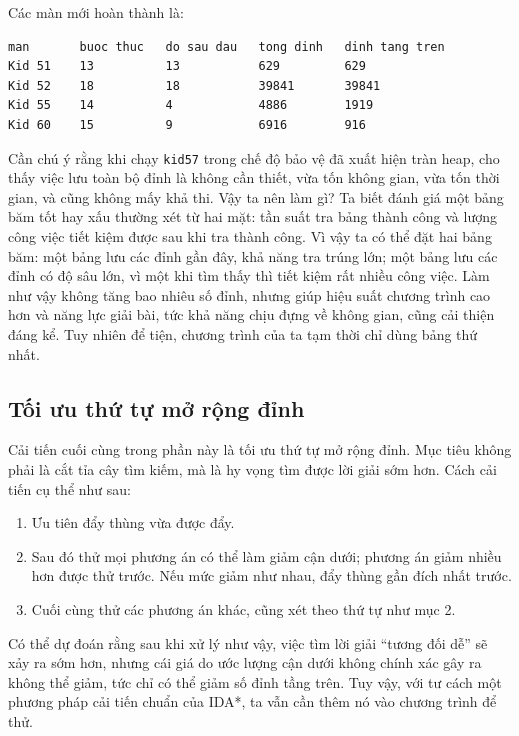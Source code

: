 \documentclass[11pt]{article}
\begin{document}
Các màn mới hoàn thành là:

\begin{verbatim}
man       buoc thuc   do sau dau   tong dinh   dinh tang tren
Kid 51    13          13           629         629
Kid 52    18          18           39841       39841
Kid 55    14          4            4886        1919
Kid 60    15          9            6916        916
\end{verbatim}

Cần chú ý rằng khi chạy \texttt{kid57} trong chế độ bảo vệ đã xuất hiện tràn
heap, cho thấy việc lưu toàn bộ đỉnh là không cần thiết, vừa tốn không gian,
vừa tốn thời gian, và cũng không mấy khả thi. Vậy ta nên làm gì? Ta biết đánh
giá một bảng băm tốt hay xấu thường xét từ hai mặt: tần suất tra bảng thành
công và lượng công việc tiết kiệm được sau khi tra thành công. Vì vậy ta có
thể đặt hai bảng băm: một bảng lưu các đỉnh gần đây, khả năng tra trúng lớn;
một bảng lưu các đỉnh có độ sâu lớn, vì một khi tìm thấy thì tiết kiệm rất
nhiều công việc. Làm như vậy không tăng bao nhiêu số đỉnh, nhưng giúp hiệu
suất chương trình cao hơn và năng lực giải bài, tức khả năng chịu đựng về
không gian, cũng cải thiện đáng kể. Tuy nhiên để tiện, chương trình của ta
tạm thời chỉ dùng bảng thứ nhất.

\subsection{Tối ưu thứ tự mở rộng đỉnh}

Cải tiến cuối cùng trong phần này là tối ưu thứ tự mở rộng đỉnh. Mục tiêu
không phải là cắt tỉa cây tìm kiếm, mà là hy vọng tìm được lời giải sớm hơn.
Cách cải tiến cụ thể như sau:

\begin{enumerate}
  \item Ưu tiên đẩy thùng vừa được đẩy.
  \item Sau đó thử mọi phương án có thể làm giảm cận dưới; phương án giảm
  nhiều hơn được thử trước. Nếu mức giảm như nhau, đẩy thùng gần đích nhất
  trước.
  \item Cuối cùng thử các phương án khác, cũng xét theo thứ tự như mục 2.
\end{enumerate}

Có thể dự đoán rằng sau khi xử lý như vậy, việc tìm lời giải ``tương đối dễ''
sẽ xảy ra sớm hơn, nhưng cái giá do ước lượng cận dưới không chính xác gây ra
không thể giảm, tức chỉ có thể giảm số đỉnh tầng trên. Tuy vậy, với tư cách
một phương pháp cải tiến chuẩn của IDA*, ta vẫn cần thêm nó vào chương trình
để thử.
\end{document}
